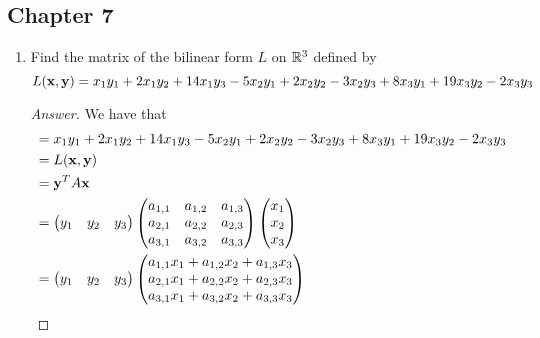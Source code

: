 \documentclass[../psets.tex]{subfiles}
\begin{document}
\subsection*{Chapter 7}
\begin{enumerate}[label={\textbf{1.\arabic*.}}]
    \item Find the matrix of the bilinear form $L$ on $\mathbb{R}^3$ defined by
    \begin{equation*}
        L(\mathbf{x},\mathbf{y}) = x_1y_1+2x_1y_2+14x_1y_3-5x_2y_1+2x_2y_2-3x_2y_3+8x_3y_1+19x_3y_2-2x_3y_3
    \end{equation*}
    \begin{proof}[Answer]
        We have that
        \begin{align*}
            &= x_1y_1+2x_1y_2+14x_1y_3-5x_2y_1+2x_2y_2-3x_2y_3+8x_3y_1+19x_3y_2-2x_3y_3\\
            &= L(\x,\y)\\
            &= \y^TA\x\\
            &=
            \begin{pmatrix}
                y_1 & y_2 & y_3\\
            \end{pmatrix}
            \begin{pmatrix}
                a_{1,1} & a_{1,2} & a_{1,3}\\
                a_{2,1} & a_{2,2} & a_{2,3}\\
                a_{3,1} & a_{3,2} & a_{3,3}\\
            \end{pmatrix}
            \begin{pmatrix}
                x_1\\
                x_2\\
                x_3\\
            \end{pmatrix}\\
            &=
            \begin{pmatrix}
                y_1 & y_2 & y_3\\
            \end{pmatrix}
            \begin{pmatrix}
                a_{1,1}x_1+a_{1,2}x_2+a_{1,3}x_3\\
                a_{2,1}x_1+a_{2,2}x_2+a_{2,3}x_3\\
                a_{3,1}x_1+a_{3,2}x_2+a_{3,3}x_3\\
            \end{pmatrix}\\

\end{align*}
\end{proof}
\end{enumerate}
\end{document}
